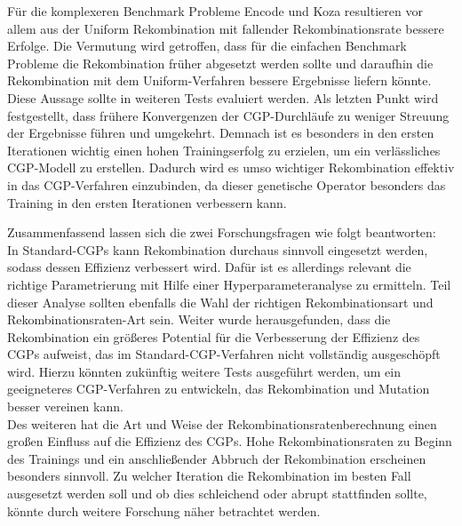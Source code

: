 Für die komplexeren Benchmark Probleme Encode und Koza resultieren vor allem aus der Uniform Rekombination mit fallender Rekombinationsrate bessere Erfolge.
Die Vermutung wird getroffen, dass für die einfachen Benchmark Probleme die Rekombination früher abgesetzt werden sollte und daraufhin die Rekombination mit dem Uniform-Verfahren bessere Ergebnisse liefern könnte.
Diese Aussage sollte in weiteren Tests evaluiert werden.
Als letzten Punkt wird festgestellt, dass frühere Konvergenzen der CGP-Durchläufe zu weniger Streuung der Ergebnisse führen und umgekehrt.
Demnach ist es besonders in den ersten Iterationen wichtig einen hohen Trainingserfolg zu erzielen, um ein verlässliches CGP-Modell zu erstellen.
Dadurch wird es umso wichtiger Rekombination effektiv in das CGP-Verfahren einzubinden, da dieser genetische Operator besonders das Training in den ersten Iterationen verbessern kann.

Zusammenfassend lassen sich die zwei Forschungsfragen wie folgt beantworten:\\
In Standard-CGPs kann Rekombination durchaus sinnvoll eingesetzt werden, sodass dessen Effizienz verbessert wird.
Dafür ist es allerdings relevant die richtige Parametrierung mit Hilfe einer Hyperparameteranalyse zu ermitteln.
Teil dieser Analyse sollten ebenfalls die Wahl der richtigen Rekombinationsart und Rekombinationsraten-Art sein.
Weiter wurde herausgefunden, dass die Rekombination ein größeres Potential für die Verbesserung der Effizienz des CGPs aufweist, das im Standard-CGP-Verfahren nicht vollständig ausgeschöpft wird.
Hierzu könnten zukünftig weitere Tests ausgeführt werden, um ein geeigneteres CGP-Verfahren zu entwickeln, das Rekombination und Mutation besser vereinen kann.\\
Des weiteren hat die Art und Weise der Rekombinationsratenberechnung einen großen Einfluss auf die Effizienz des CGPs. 
Hohe Rekombinationsraten zu Beginn des Trainings und ein anschließender Abbruch der Rekombination erscheinen besonders sinnvoll.
Zu welcher Iteration die Rekombination im besten Fall ausgesetzt werden soll und ob dies schleichend oder abrupt stattfinden sollte, könnte durch weitere Forschung näher betrachtet werden.
